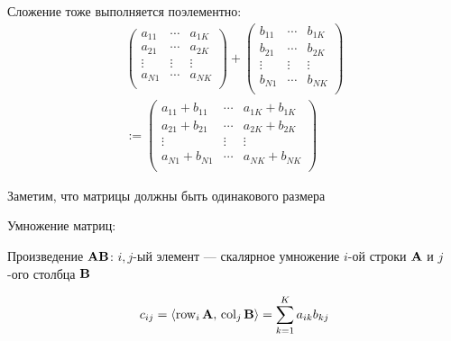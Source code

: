 \begin{frame}
    
    \vspace{2em}
    Сложение тоже выполняется поэлементно:
    \begin{multline*}
        \left(
        \begin{array}{ccc}
            a_{11} & \cdots & a_{1K} \\
            a_{21} & \cdots & a_{2K} \\
            \vdots & \vdots & \vdots \\
            a_{N1} & \cdots & a_{NK} \\
        \end{array}
        \right)
        +
        \left(
        \begin{array}{ccc}
            b_{11} & \cdots & b_{1K} \\
            b_{21} & \cdots & b_{2K} \\
            \vdots & \vdots & \vdots \\
            b_{N1} & \cdots & b_{NK} \\
        \end{array}
        \right)
        \\
        :=
        \left(
        \begin{array}{ccc}
            a_{11} + b_{11} &  \cdots & a_{1K} + b_{1K} \\
            a_{21} + b_{21} &  \cdots & a_{2K} + b_{2K} \\
            \vdots & \vdots & \vdots \\
            a_{N1} + b_{N1} &  \cdots & a_{NK} + b_{NK} \\
        \end{array}
        \right)
    \end{multline*}

    Заметим, что матрицы должны быть одинакового размера

\end{frame}

\begin{frame}
    
    \vspace{2em}
    Умножение матриц:  
    
    \vspace{.7em}
    Произведение $\mathbf A \mathbf B$: 
    $i,j$-ый элемент --- скалярное умножение $i$-ой строки $\mathbf A$ и 
    $j$-ого столбца $\mathbf B$  
    
    \begin{equation*}
    c_{ij} = \left\langle{\operatorname{row}_i \mathbf A,\,  \operatorname{col}_j  \mathbf B}\right\rangle = \sum_{k=1}^K a_{ik} b_{kj}
    \end{equation*}
\end{frame}



